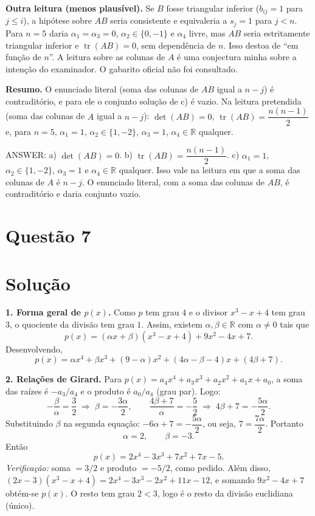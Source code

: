 \documentclass{article}%
\begin{document}
\textbf{Outra leitura (menos plausível).} Se $B$ fosse triangular inferior ($b_{ij}=1$ para $j\le i$), a hipótese sobre $AB$ seria consistente e equivaleria a $s_j=1$ para $j<n$. Para $n=5$ daria $\alpha_1=\alpha_3=0$, $\alpha_2\in\{0,-1\}$ e $\alpha_4$ livre, mas $AB$ seria estritamente triangular inferior e $\operatorname{tr}(AB)=0$, sem dependência de $n$. Isso destoa de ``em função de $n$''. A leitura sobre as colunas de $A$ é uma conjectura minha sobre a intenção do examinador. O gabarito oficial não foi consultado.

\textbf{Resumo.} O enunciado literal (soma das colunas de $AB$ igual a $n-j$) é contraditório, e para ele o conjunto solução de c) é vazio. Na leitura pretendida (soma das colunas de $A$ igual a $n-j$): $\det(AB)=0$, $\operatorname{tr}(AB)=\dfrac{n(n-1)}{2}$ e, para $n=5$, $\alpha_1=1$, $\alpha_2\in\{1,-2\}$, $\alpha_3=1$, $\alpha_4\in\mathbb{R}$ qualquer.

ANSWER: a) $\det(AB)=0$. b) $\operatorname{tr}(AB)=\dfrac{n(n-1)}{2}$. c) $\alpha_1=1$, $\alpha_2\in\{1,-2\}$, $\alpha_3=1$ e $\alpha_4\in\mathbb{R}$ qualquer. Isso vale na leitura em que a soma das colunas de $A$ é $n-j$. O enunciado literal, com a soma das colunas de $AB$, é contraditório e daria conjunto vazio.%
\newpage%
\section*{Questão 7}

\section*{Solução}

\textbf{1. Forma geral de $p(x)$.} Como $p$ tem grau $4$ e o divisor $x^3-x+4$ tem grau $3$, o quociente da divisão tem grau $1$. Assim, existem $\alpha,\beta\in\mathbb{R}$ com $\alpha\neq 0$ tais que
\[
p(x)=(\alpha x+\beta)(x^3-x+4)+9x^2-4x+7 .
\]
Desenvolvendo,
\[
p(x)=\alpha x^4+\beta x^3+(9-\alpha)x^2+(4\alpha-\beta-4)x+(4\beta+7).
\]

\textbf{2. Relações de Girard.} Para $p(x)=a_4x^4+a_3x^3+a_2x^2+a_1x+a_0$, a soma das raízes é $-a_3/a_4$ e o produto é $a_0/a_4$ (grau par). Logo:
\[
-\frac{\beta}{\alpha}=\frac32 \;\Rightarrow\; \beta=-\frac{3\alpha}{2},
\qquad
\frac{4\beta+7}{\alpha}=-\frac52 \;\Rightarrow\; 4\beta+7=-\frac{5\alpha}{2}.
\]
Substituindo $\beta$ na segunda equação: $-6\alpha+7=-\dfrac{5\alpha}{2}$, ou seja, $7=\dfrac{7\alpha}{2}$. Portanto
\[
\alpha=2,\qquad \beta=-3 .
\]
Então
\[
p(x)=2x^4-3x^3+7x^2+7x-5 .
\]
\textit{Verificação:} soma $=3/2$ e produto $=-5/2$, como pedido. Além disso, $(2x-3)(x^3-x+4)=2x^4-3x^3-2x^2+11x-12$, e somando $9x^2-4x+7$ obtém-se $p(x)$. O resto tem grau $2<3$, logo é o resto da divisão euclidiana (único).
\end{document}
